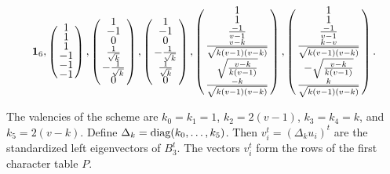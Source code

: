 \documentclass[../../../main]{subfiles}
\begin{document}
\[
 \jj_6,
 \arraycolsep=1.25pt\def\arraystretch{0.625}
 \left(\begin{array}{c}
  1 \\ 1 \\ 1 \\ -1 \\ -1 \\ -1
 \end{array}\right),
 \arraycolsep=1.25pt\def\arraystretch{0.625}
 \left(\begin{array}{c}
  1 \\ -1 \\ 0 \\ \frac{1}{\sqrt{k}} \\ -\frac{1}{\sqrt{k}} \\ 0
 \end{array}\right),
 \arraycolsep=1.25pt\def\arraystretch{0.625}
 \left(\begin{array}{c}
  1 \\ -1 \\ 0 \\ -\frac{1}{\sqrt{k}} \\ \frac{1}{\sqrt{k}} \\ 0
 \end{array}\right),
 \arraycolsep=1.25pt\def\arraystretch{0.625}
 \left(\begin{array}{c}
 1 \\ 1 \\ \frac{-1}{v-1} \\ \frac{v-k}{\sqrt{k(v-1)(v-k)}} \\ \sqrt{\frac{v-k}{k(v-1)}} \\ \frac{-k}{\sqrt{k(v-1)(v-k)}}
 \end{array}\right),
 \arraycolsep=1.25pt\def\arraystretch{0.625}
 \left(\begin{array}{c}
 1 \\ 1 \\ \frac{-1}{v-1} \\ \frac{k-v}{\sqrt{k(v-1)(v-k)}} \\ -\sqrt{\frac{v-k}{k(v-1)}} \\ \frac{k}{\sqrt{k(v-1)(v-k)}}
 \end{array}\right).
\]

The valencies of the scheme are $k_0=k_1=1$, $k_2=2(v-1)$, $k_3=k_4=k$, and $k_5=2(v-k)$. Define $\Delta_k = \text{diag}(k_0, \dots,k_5)$. Then $v_i^t=(\Delta_ku_i)^t$ are the standardized left eigenvectors of $B_3^t$. The vectors $v_i^t$ form the rows of the first character table $P$. 
\end{document}
